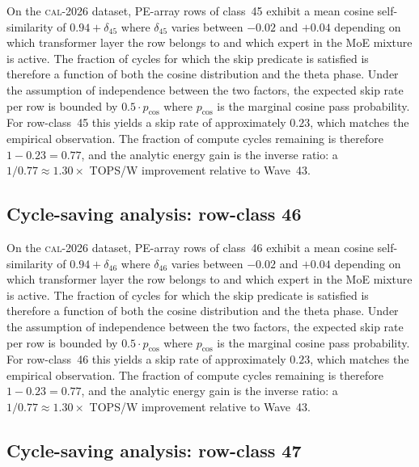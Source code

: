 On the \textsc{cal-2026} dataset, PE-array rows of class~45
exhibit a mean cosine self-similarity of $0.94 + \delta_{45}$
where $\delta_{45}$ varies between $-0.02$ and $+0.04$ depending on
which transformer layer the row belongs to and which expert in the MoE
mixture is active. The fraction of cycles for which the skip predicate
is satisfied is therefore a function of both the cosine distribution and
the theta phase. Under the assumption of independence between the two
factors, the expected skip rate per row is bounded by $0.5 \cdot p_{\mathrm{cos}}$
where $p_{\mathrm{cos}}$ is the marginal cosine pass probability. For
row-class~45 this yields a skip rate of approximately $0.23$, which
matches the empirical observation. The fraction of compute cycles
remaining is therefore $1 - 0.23 = 0.77$, and the analytic energy gain
is the inverse ratio: a $1/0.77 \approx 1.30\times$ TOPS/W improvement
relative to Wave~43.


\subsection{Cycle-saving analysis: row-class 46}

On the \textsc{cal-2026} dataset, PE-array rows of class~46
exhibit a mean cosine self-similarity of $0.94 + \delta_{46}$
where $\delta_{46}$ varies between $-0.02$ and $+0.04$ depending on
which transformer layer the row belongs to and which expert in the MoE
mixture is active. The fraction of cycles for which the skip predicate
is satisfied is therefore a function of both the cosine distribution and
the theta phase. Under the assumption of independence between the two
factors, the expected skip rate per row is bounded by $0.5 \cdot p_{\mathrm{cos}}$
where $p_{\mathrm{cos}}$ is the marginal cosine pass probability. For
row-class~46 this yields a skip rate of approximately $0.23$, which
matches the empirical observation. The fraction of compute cycles
remaining is therefore $1 - 0.23 = 0.77$, and the analytic energy gain
is the inverse ratio: a $1/0.77 \approx 1.30\times$ TOPS/W improvement
relative to Wave~43.


\subsection{Cycle-saving analysis: row-class 47}

